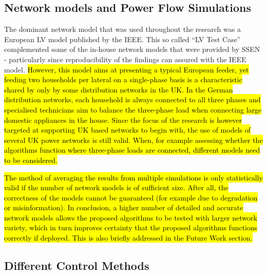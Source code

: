 \subsection{Network models and Power Flow Simulations}

The dominant network model that was used throughout the research was a European LV model published by the IEEE.
This so called ``LV Test Case'' complemented some of the in-house network models that were provided by SSEN - particularly since reproducibility of the findings can assured with the IEEE model.
\hl{However, this model aims at presenting a typical European feeder, yet feeding two households per lateral on a single-phase basis is a characteristic shared by only by some distribution networks in the UK.
In the German distribution networks, each household is always connected to all three phases and specialised technicians aim to balance the three-phase load when connecting large domestic appliances in the house.
Since the focus of the research is however targeted at supporting UK based networks to begin with, the use of models of several UK power networks is still valid.
When, for example assessing whether the algorithms function where three-phase loads are connected, different models need to be considered.}

\hl{The method of averaging the results from multiple simulations is only statistically valid if the number of network models is of sufficient size.
After all, the correctness of the models cannot be guaranteed (for example due to degradation or misinformation).
In conclusion, a higher number of detailed and accurate network models allows the proposed algorithms to be tested with larger network variety, which in turn improves certainty that the proposed algorithms functions correctly if deployed.
This is also briefly addressed in the Future Work section.}

\subsection{Different Control Methods}

